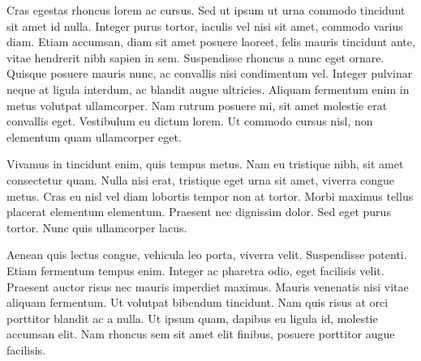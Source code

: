 Cras egestas rhoncus lorem ac cursus. Sed ut ipsum ut urna commodo tincidunt sit
amet id nulla. Integer purus tortor, iaculis vel nisi sit amet, commodo varius
diam. Etiam accumsan, diam sit amet posuere laoreet, felis mauris tincidunt
ante, vitae hendrerit nibh sapien in sem. Suspendisse rhoncus a nunc eget
ornare. Quisque posuere mauris nunc, ac convallis nisi condimentum vel. Integer
pulvinar neque at ligula interdum, ac blandit augue ultricies. Aliquam fermentum
enim in metus volutpat ullamcorper. Nam rutrum posuere mi, sit amet molestie
erat convallis eget. Vestibulum eu dictum lorem. Ut commodo cursus nisl, non
elementum quam ullamcorper eget.

Vivamus in tincidunt enim, quis tempus metus. Nam eu tristique nibh, sit amet
consectetur quam. Nulla nisi erat, tristique eget urna sit amet, viverra congue
metus. Cras eu nisl vel diam lobortis tempor non at tortor. Morbi maximus tellus
placerat elementum elementum. Praesent nec dignissim dolor. Sed eget purus
tortor. Nunc quis ullamcorper lacus.

Aenean quis lectus congue, vehicula leo porta, viverra velit. Suspendisse
potenti. Etiam fermentum tempus enim. Integer ac pharetra odio, eget facilisis
velit. Praesent auctor risus nec mauris imperdiet maximus. Mauris venenatis nisi
vitae aliquam fermentum. Ut volutpat bibendum tincidunt. Nam quis risus at orci
porttitor blandit ac a nulla. Ut ipsum quam, dapibus eu ligula id, molestie
accumsan elit. Nam rhoncus sem sit amet elit finibus, posuere porttitor augue
facilisis.

